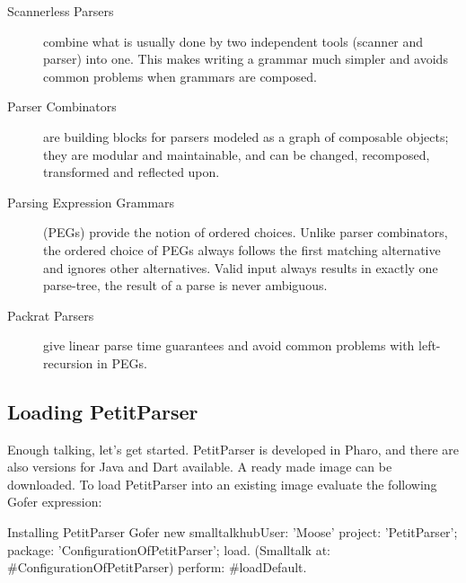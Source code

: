\documentclass[a4paper,10pt,twoside]{book}
\begin{document}
\begin{description}
\item[Scannerless Parsers] combine what is usually done by two
  independent tools (scanner and parser) into one. This makes writing
  a grammar much simpler and avoids common problems when grammars are
  composed.

\item[Parser Combinators] are building blocks for parsers modeled as a
  graph of composable objects; they are modular and maintainable, and
  can be changed, recomposed, transformed and reflected upon.

\item[Parsing Expression Grammars] (PEGs) provide the notion of
  ordered choices. Unlike parser combinators, the ordered choice of
  PEGs always follows the first matching alternative and ignores other
  alternatives. Valid input always results in exactly one parse-tree,
  the result of a parse is never ambiguous.

\item[Packrat Parsers] give linear parse time guarantees and avoid
  common problems with left-recursion in PEGs.
\end{description}

\subsection{Loading PetitParser}

Enough talking, let's get started. PetitParser is developed in Pharo,
and there are also versions for Java and Dart available. A ready made
image can be downloaded\footnotemark. To load PetitParser into an
existing image evaluate the following Gofer expression:


\begin{script}{Installing PetitParser}
Gofer new
  smalltalkhubUser: 'Moose' project: 'PetitParser';
  package: 'ConfigurationOfPetitParser';
  load.
(Smalltalk at: #ConfigurationOfPetitParser) perform: #loadDefault.
\end{script}


\end{document}

